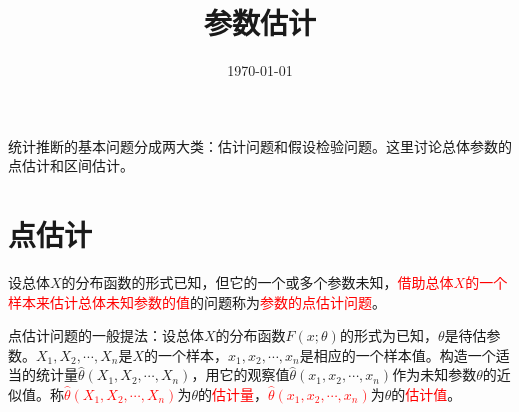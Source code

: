 \documentclass[12pt,a4paper]{article}
\title{参数估计}
\author{}
\date{\today}
\begin{document}
\maketitle

统计推断的基本问题分成两大类：估计问题和假设检验问题。这里讨论总体参数的点估计和区间估计。

\section{点估计}
设总体$X$的分布函数的形式已知，但它的一个或多个参数未知，\textcolor{red}{借助总体$X$的一个样本来估计总体未知参数的值}的问题称为\textcolor{red}{参数的点估计问题}。


点估计问题的一般提法：设总体$X$的分布函数$F(x;\theta)$的形式为已知，$\theta$是待估参数。$X_1, X_2, \cdots, X_n$是$X$的一个样本，$x_1, x_2, \cdots, x_n$是相应的一个样本值。构造一个适当的统计量$\hat{\theta}(X_1, X_2, \cdots, X_n)$，用它的观察值$\hat{\theta}(x_1, x_2, \cdots, x_n)$作为未知参数$\theta$的近似值。称\textcolor{red}{$\hat{\theta}(X_1, X_2, \cdots, X_n)$}为$\theta$的\textcolor{red}{估计量}，\textcolor{red}{$\hat{\theta}(x_1, x_2, \cdots, x_n)$}为$\theta$的\textcolor{red}{估计值}。
\end{document}
